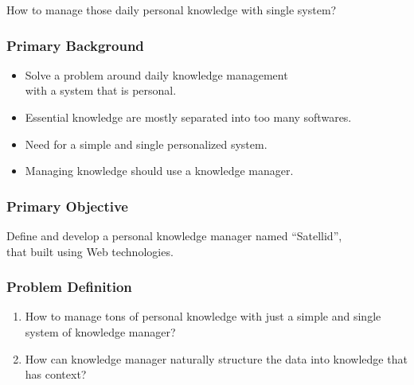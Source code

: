 \documentclass[10pt, compress]{beamer}
\begin{document}

\begin{frame}[fragile]
  \centering

  How to manage those \alert{daily personal knowledge} with \alert{single system}?

\end{frame}


\begin{frame}[fragile]
  \frametitle{Primary Background}

  \begin{itemize} \itemsep0pt
    \item Solve a problem around \alert{daily knowledge management} \\
          with a system that is personal.
    \item Essential knowledge are mostly separated into too many softwares.
    \item Need for a simple and single personalized system.
    \item Managing knowledge should use a knowledge manager.
  \end{itemize}

\end{frame}


\begin{frame}[fragile]
  \frametitle{Primary Objective}

  Define and develop a personal knowledge manager named \alert{``Satellid''},\\
  that built using Web technologies.

\end{frame}


\begin{frame}[fragile]
  \frametitle{Problem Definition}

  \begin{enumerate}
    \item How to manage tons of personal knowledge with just a simple and single system of knowledge manager?
    \item How can knowledge manager naturally structure the data into knowledge that has context?
  \end{enumerate}

\end{frame}
\end{document}
